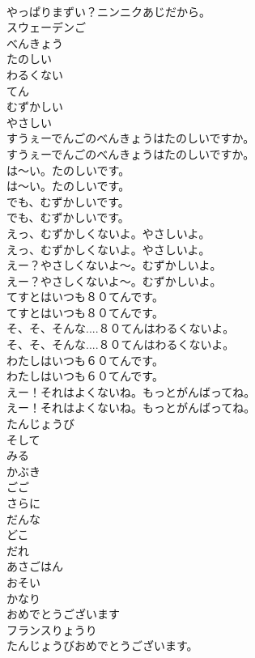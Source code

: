 \documentclass[8pt]{extreport}
\begin{document}
\begin{CJK}{UTF8}{min}
\\	やっぱりまずい？ニンニクあじだから。 
\\	スウェーデンご
\\	べんきょう
\\	たのしい
\\	わるくない
\\	てん
\\	むずかしい
\\	やさしい
\\	すうぇーでんごのべんきょうはたのしいですか。	
\\	すうぇーでんごのべんきょうはたのしいですか。 
\\	は〜い。たのしいです。	
\\	は〜い。たのしいです。 
\\	でも、むずかしいです。	
\\	でも、むずかしいです。 
\\	えっ、むずかしくないよ。やさしいよ。	
\\	えっ、むずかしくないよ。やさしいよ。 
\\	えー？やさしくないよ〜。むずかしいよ。	
\\	えー？やさしくないよ〜。むずかしいよ。 
\\	てすとはいつも８０てんです。	
\\	てすとはいつも８０てんです。 
\\	そ、そ、そんな....８０てんはわるくないよ。	
\\	そ、そ、そんな....８０てんはわるくないよ。 
\\	わたしはいつも６０てんです。	
\\	わたしはいつも６０てんです。 
\\	えー！それはよくないね。もっとがんばってね。	
\\	えー！それはよくないね。もっとがんばってね。 
\\	たんじょうび
\\	そして
\\	みる
\\	かぶき
\\	ごご
\\	さらに
\\	だんな
\\	どこ
\\	だれ
\\	あさごはん
\\	おそい
\\	かなり
\\	おめでとうございます
\\	フランスりょうり
\\	たんじょうびおめでとうございます。	

\end{CJK}
\end{document}
